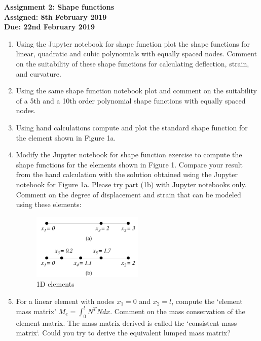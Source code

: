 \documentclass[a4paper,12pt]{article}
\begin{document}
\begin{centering}
	\textbf{
		Assignment 2: Shape functions\\
		Assigned: 8th February 2019\\
		Due: 22nd February 2019\\
	}
\end{centering}

\vspace{1em}
 
\begin{enumerate}

	\item Using the Jupyter notebook for shape function plot the shape functions for linear, quadratic and cubic polynomials with equally spaced nodes. Comment on the suitability of these shape functions for calculating deflection, strain, and curvature.
	
	\item Using the same shape function notebook plot and comment on the suitability of a 5th and a 10th order polynomial shape functions with equally spaced nodes.

	\item Using hand calculations compute and plot the standard shape function for the element shown in Figure 1a.
	
	\item Modify the Jupyter notebook for shape function exercise to compute the shape functions for the elements shown in Figure 1. Compare your result from the  hand calculation with the solution obtained using the Jupyter notebook for Figure 1a. Please try part (1b) with Jupyter notebooks only. Comment on the degree of displacement and strain that can be modeled using these elements:
	\begin{figure}[!h]
		\centering
		\includegraphics[width=0.5\textwidth]{figs/shapefns.png}
		\caption{1D elements}
	\end{figure}

	\item For a linear element with nodes $x_1 = 0$ and $x_2 = l$, compute the `element mass matrix' $M_e = \int_0^l N^T N dx$. Comment on the mass conservation of the element matrix. The mass matrix derived is called the `consistent mass matrix`. Could you try to derive the equivalent lumped mass matrix?
	
\end{enumerate}
\end{document}
